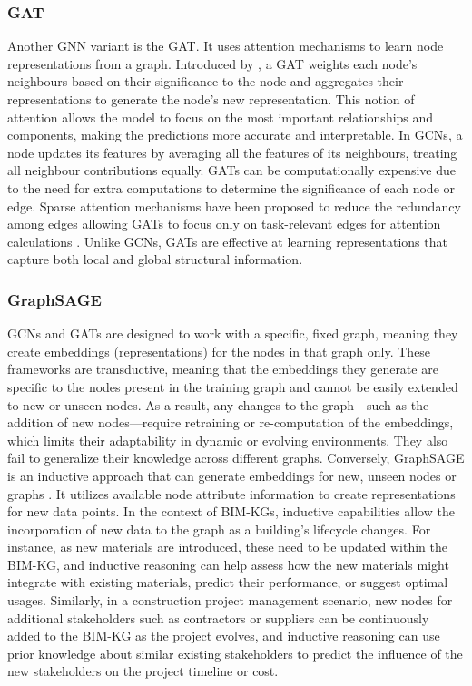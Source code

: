 \subsubsection{\ac{GAT}} 
Another \ac{GNN} variant is the \ac{GAT}. It uses attention mechanisms to learn node representations from a graph. Introduced by \cite{Velickovic2017GraphNetworks}, a \ac{GAT} weights each node's neighbours based on their significance to the node and aggregates their representations to generate the node's new representation. This notion of attention allows the model to focus on the most important relationships and components, making the predictions more accurate and interpretable. In \acp{GCN}, a node updates its features by averaging all the features of its neighbours, treating all neighbour contributions equally. \acp{GAT} can be computationally expensive due to the need for extra computations to determine the significance of each node or edge. Sparse attention mechanisms have been proposed to reduce the redundancy among edges allowing \acp{GAT} to focus only on task-relevant edges for attention calculations \citep{Ye2019SparseNetworks}. Unlike \acp{GCN}, \acp{GAT} are effective at learning representations that capture both local and global structural information.

\subsubsection{\ac{GraphSAGE}} 
\acp{GCN} and \acp{GAT} are designed to work with a specific, fixed graph, meaning they create embeddings (representations) for the nodes in that graph only. These frameworks are transductive, meaning that the embeddings they generate are specific to the nodes present in the training graph and cannot be easily extended to new or unseen nodes. As a result, any changes to the graph—such as the addition of new nodes—require retraining or re-computation of the embeddings, which limits their adaptability in dynamic or evolving environments. They also fail to generalize their knowledge across different graphs. Conversely, \ac{GraphSAGE} is an inductive approach that can generate embeddings for new, unseen nodes or graphs \cite{Hamilton2017InductiveGraphs}. It utilizes available node attribute information to create representations for new data points. In the context of \acp{BIM-KG}, inductive capabilities allow the incorporation of new data to the graph as a building's lifecycle changes. For instance, as new materials are introduced, these need to be updated within the \ac{BIM-KG}, and inductive reasoning can help assess how the new materials might integrate with existing materials, predict their performance, or suggest optimal usages. Similarly, in a construction project management scenario, new nodes for additional stakeholders such as contractors or suppliers can be continuously added to the \ac{BIM-KG} as the project evolves, and inductive reasoning can use prior knowledge about similar existing stakeholders to predict the influence of the new stakeholders on the project timeline or cost.

